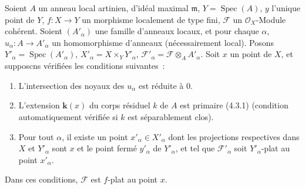 \begin{proposition}[11.4.11]
\label{IV.11.4.11-fr}
Soient $A$ un anneau local artinien, d'idéal maximal $\mathfrak m$,
$Y=\operatorname{Spec}(A)$, $y$ l'unique point de $Y$, $f:X\to Y$ un morphisme
localement de type fini, $\mathcal F$ un $\mathcal O_X$-Module cohérent. Soient
$(A'_\alpha)$ une famille d'anneaux locaux, et pour chaque $\alpha$,
$u_\alpha:A\to A'_\alpha$ un homomorphisme d'anneaux (nécessairement local).
Posons $Y'_\alpha=\operatorname{Spec}(A'_\alpha)$,
$X'_\alpha=X\times_Y Y'_\alpha$,
$\mathcal F'_\alpha=\mathcal F\otimes_A A'_\alpha$. Soit $x$ un point de $X$,
et supposcns vérifiées les conditions suivantes~:
\begin{enumerate}[label=\textup{(\roman*)}]
  \item L'intersection des noyaux des $u_\alpha$ est réduite à $0$.
  \item L'extension $\boldsymbol{k}(x)$ du corps résiduel $k$ de $A$ est primaire \textup{(4.3.1)}
  (condition automatiquement vérifiée si $k$ est séparablement clos).
  \item Pour tout $\alpha$, il existe un point $x'_\alpha\in X'_\alpha$ dont
  les projections respectives dans $X$ et $Y'_\alpha$ sont $x$ et le point
  fermé $y'_\alpha$ de $Y'_\alpha$, et tel que $\mathcal F'_\alpha$ soit
  $Y'_\alpha$-plat au point $x'_\alpha$.
\end{enumerate}

Dans ces conditions, $\mathcal F$ est $f$-plat au point $x$.
\end{proposition}


